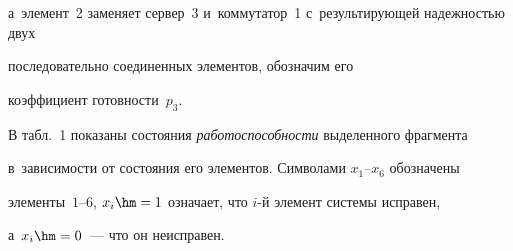 \noindent 

а~элемент~2 заменяет сервер~3 и~коммутатор~1 с~результирующей на\-деж\-ностью двух 

последовательно соединенных элементов, обозначим его\linebreak

 коэффициент го\-тов\-ности~$p_3$.













      В табл.~1 показаны состояния \textit{работоспособности} выделенного фрагмента 

в~зависимости от состояния его элементов. Символами $x_1\mbox{--}x_6$ обозначены 

элементы~$1\mbox{--}6$, $x_i\hm = 1$ означает, что $i$-й элемент системы исправен, 

а~$x_i\hm=0$~--- что он неисправен. 



